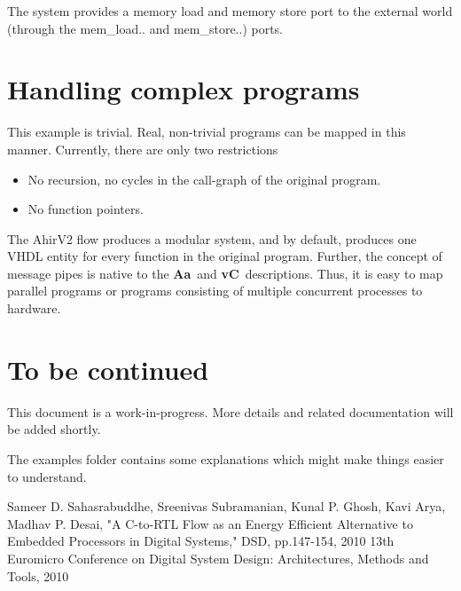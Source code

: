 \documentclass{article}
\newcommand{\Aa}{{\bf Aa}~}
\newcommand{\vC}{{\bf vC}~}
\begin{document}
The system provides a memory load and memory store
port to the external world (through the mem\_load.. and mem\_store..)
ports.

\section{Handling complex programs}

This example is trivial.  Real, non-trivial programs can be
mapped in this manner.  Currently, there are only
two restrictions
\begin{itemize}
\item No recursion, no cycles in the call-graph of the original
program.
\item No function pointers.
\end{itemize}

The AhirV2 flow produces a modular system, and by default,
produces one VHDL entity for every function in the original
program.  Further, the concept of message pipes is native
to the \Aa and \vC descriptions.  Thus, it is easy to
map parallel programs or programs consisting of multiple
concurrent processes to hardware.

\section{To be continued}

This document is a work-in-progress.  More details and
related documentation will be added shortly.

The examples folder contains some explanations which might
make things easier to understand.

\begin{thebibliography}{99}
Sameer D. Sahasrabuddhe, Sreenivas Subramanian, Kunal P. Ghosh, Kavi Arya, Madhav P. Desai, 
"A C-to-RTL Flow as an Energy Efficient Alternative to Embedded Processors in Digital Systems," 
DSD, pp.147-154, 2010 13th Euromicro Conference on Digital 
System Design: Architectures, Methods and Tools, 2010
\end{thebibliography}
\end{document}
